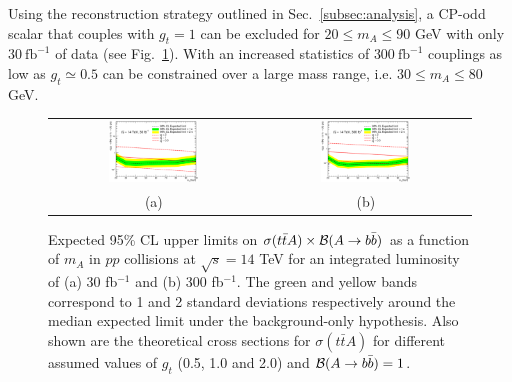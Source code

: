 \documentclass[preprintnumbers,superscriptaddress,nofootinbib,aps,prd,floatfix]{revtex4}
\newcommand{\ttbar}{\ensuremath{t\bar{t}}}
\begin{document}
Using the reconstruction strategy outlined in Sec.~\ref{subsec:analysis}, a CP-odd scalar that couples with $g_t=1$ can be excluded for $20 \leq m_A \leq 90$ GeV with only $30~\mathrm{fb}^{-1}$ of data (see Fig.~\ref{fig:limit_plots}). With an increased statistics of $300~\mathrm{fb}^{-1}$ couplings as low as $g_t \simeq 0.5$ can be constrained over a large mass range, i.e. $30 \leq m_A \leq 80$ GeV.

\begin{figure}[htbp]
\begin{center}
\begin{tabular}{cc}
\includegraphics[width=0.45\textwidth]{Figures/BrasilianPlots/TTA_14_30.eps} &
\includegraphics[width=0.45\textwidth]{Figures/BrasilianPlots/TTA_14_300.eps} \\
(a) & (b) \\
\end{tabular}
\caption{\small {Expected 95\% CL upper limits on $\sigma(\ttbar A) \times {\cal B}(A\to b\bar{b})$ as a function of $m_A$ 
in $pp$ collisions at $\sqrt{s}=14$ TeV for an integrated luminosity of (a) 30 fb$^{-1}$ and (b) 300 fb$^{-1}$. 
The green and yellow bands correspond to 1 and 2 standard deviations respectively around the median expected limit 
under the background-only hypothesis. Also shown are the theoretical cross sections for $\sigma(\ttbar A)$ for different  
assumed values of $g_t$ (0.5, 1.0 and 2.0) and ${\cal B}(A\to b\bar{b})=1$.}}
\label{fig:limit_plots}
\end{center}
\end{figure}
\end{document}
